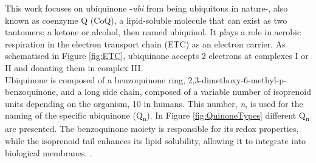 This work focuses on ubiquinone -\textit{ubi} from being ubiquitous in nature-, also known as coenzyme Q (CoQ), a lipid-soluble molecule that can exist as two tautomers: a ketone or alcohol, then named ubiquinol. It plays a role in aerobic respiration in the electron transport chain (ETC) as an electron carrier. As schematised in Figure \ref{fig:ETC}, ubiquinone accepts 2 electrons at complexes I or II and donating them in complex III\cite{ernster1995biochemical}.\\

Ubiquinone is composed of a benzoquinone ring, 2,3-dimethoxy-6-methyl-p-benzoquinone, and a long side chain, composed of a variable number of isoprenoid units depending on the organism, 10 in humans. This number, \textit{n}, is used for the naming of the specific ubiquinone (Q\textsubscript{n}). In Figure \ref{fig:QuinoneTypes} different Q\textsubscript{n} are presented. The benzoquinone moiety is responsible for its redox properties, while the isoprenoid tail enhances its lipid solubility, allowing it to integrate into biological membranes. \cite{ernster1995biochemical}.\\

